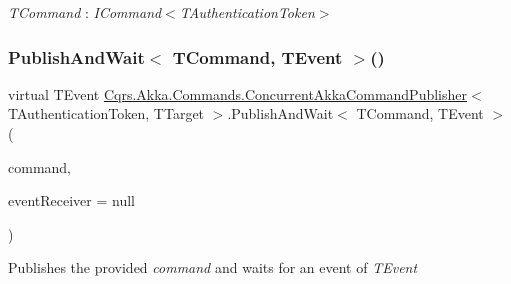 \begin{Desc}
\item[Type Constraints]\begin{description}
\item[{\em T\+Command} : {\em I\+Command$<$T\+Authentication\+Token$>$}]\end{description}
\end{Desc}
\mbox{\label{classCqrs_1_1Akka_1_1Commands_1_1ConcurrentAkkaCommandPublisher_ad88c8edbc1e145807a400a246cb6531b_ad88c8edbc1e145807a400a246cb6531b}} 
\subsubsection{\texorpdfstring{Publish\+And\+Wait$<$ T\+Command, T\+Event $>$()}{PublishAndWait< TCommand, TEvent >()}\hspace{0.1cm}{\footnotesize\ttfamily [1/6]}}
{\footnotesize\ttfamily virtual T\+Event \hyperlink{classCqrs_1_1Akka_1_1Commands_1_1ConcurrentAkkaCommandPublisher}{Cqrs.\+Akka.\+Commands.\+Concurrent\+Akka\+Command\+Publisher}$<$ T\+Authentication\+Token, T\+Target $>$.Publish\+And\+Wait$<$ T\+Command, T\+Event $>$ (\begin{DoxyParamCaption}\item[{T\+Command}]{command,  }\item[{\hyperlink{interfaceCqrs_1_1Events_1_1IEventReceiver}{I\+Event\+Receiver}$<$ T\+Authentication\+Token $>$}]{event\+Receiver = {\ttfamily null} }\end{DoxyParamCaption})\hspace{0.3cm}{\ttfamily [virtual]}}



Publishes the provided {\itshape command}  and waits for an event of {\itshape T\+Event}  



